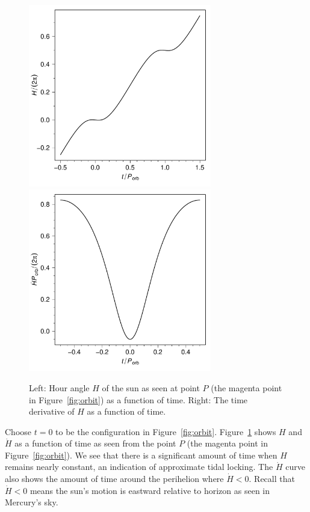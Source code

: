 \documentclass[12pt]{article}
\begin{document}
\begin{center}
\begin{figure}
\includegraphics[width=8cm]{HourAngle.pdf}
\includegraphics[width=8cm]{Hdot.pdf}
\caption{Left: Hour angle $H$ of the sun as seen at point $P$ (the 
magenta point in Figure~\ref{fig:orbit}) as a function of time. 
Right: The time derivative of $H$ as a function of time.}
\label{fig:H-Hdot}
\end{figure}
\end{center}

Choose $t=0$ to be the configuration in Figure~\ref{fig:orbit}. 
Figure~\ref{fig:H-Hdot} shows $H$ and $\dot{H}$ as a function of 
time as seen from the point $P$ (the magenta point in Figure~\ref{fig:orbit}). 
We see that there is a significant amount of time when $H$ remains nearly 
constant, an indication of approximate tidal locking. The $\dot{H}$ curve 
also shows the amount of time around the perihelion where $\dot{H} < 0$. 
Recall that $\dot{H} < 0$ means the sun's motion is eastward relative 
to horizon as seen in Mercury's sky. 
\end{document}
